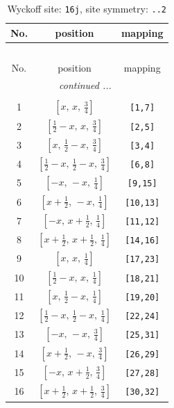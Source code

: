 \documentclass[fleqn,8pt]{jsarticle}
\begin{document}
\renewcommand{\arraystretch}{1.2}
\begin{longtable}{ccc}
\caption{Wyckoff site: {\tt 16j}, site symmetry: {\tt ..2}}
 \\
 \hline \hline
No. & position & mapping \\ \hline \endfirsthead

\multicolumn{2}{l}{\tablename\ \thetable{}} \\
 \hline \hline
No. & position & mapping \\ \hline \endhead

 \hline \hline
\multicolumn{2}{r}{\footnotesize\it continued ...} \\ \endfoot

 \hline \hline
\multicolumn{2}{r}{} \\ \endlastfoot

1 & $\left[ x,\, x,\, \frac{3}{4} \right]$ & {\tt [1,7]} \\ \hline
2 & $\left[ \frac{1}{2} - x,\, x,\, \frac{3}{4} \right]$ & {\tt [2,5]} \\ \hline
3 & $\left[ x,\, \frac{1}{2} - x,\, \frac{3}{4} \right]$ & {\tt [3,4]} \\ \hline
4 & $\left[ \frac{1}{2} - x,\, \frac{1}{2} - x,\, \frac{3}{4} \right]$ & {\tt [6,8]} \\ \hline
5 & $\left[ - x,\, - x,\, \frac{1}{4} \right]$ & {\tt [9,15]} \\ \hline
6 & $\left[ x + \frac{1}{2},\, - x,\, \frac{1}{4} \right]$ & {\tt [10,13]} \\ \hline
7 & $\left[ - x,\, x + \frac{1}{2},\, \frac{1}{4} \right]$ & {\tt [11,12]} \\ \hline
8 & $\left[ x + \frac{1}{2},\, x + \frac{1}{2},\, \frac{1}{4} \right]$ & {\tt [14,16]} \\ \hline
9 & $\left[ x,\, x,\, \frac{1}{4} \right]$ & {\tt [17,23]} \\ \hline
10 & $\left[ \frac{1}{2} - x,\, x,\, \frac{1}{4} \right]$ & {\tt [18,21]} \\ \hline
11 & $\left[ x,\, \frac{1}{2} - x,\, \frac{1}{4} \right]$ & {\tt [19,20]} \\ \hline
12 & $\left[ \frac{1}{2} - x,\, \frac{1}{2} - x,\, \frac{1}{4} \right]$ & {\tt [22,24]} \\ \hline
13 & $\left[ - x,\, - x,\, \frac{3}{4} \right]$ & {\tt [25,31]} \\ \hline
14 & $\left[ x + \frac{1}{2},\, - x,\, \frac{3}{4} \right]$ & {\tt [26,29]} \\ \hline
15 & $\left[ - x,\, x + \frac{1}{2},\, \frac{3}{4} \right]$ & {\tt [27,28]} \\ \hline
16 & $\left[ x + \frac{1}{2},\, x + \frac{1}{2},\, \frac{3}{4} \right]$ & {\tt [30,32]} \\
\end{longtable}
\end{document}
